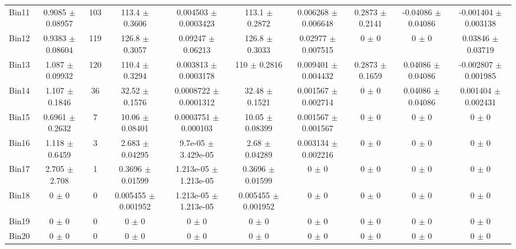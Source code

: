 \begin{tabular}{@{\extracolsep{4pt}}lccccccccc@{}}
     Bin11 & 0.9085 $\pm$ 0.08957 & 103 & 113.4 $\pm$ 0.3606 & 0.004503 $\pm$ 0.0003423 & 113.1 $\pm$ 0.2872 & 0.006268 $\pm$ 0.006648 & 0.2873 $\pm$ 0.2141 & -0.04086 $\pm$ 0.04086 & -0.001404 $\pm$ 0.003138 \\ 
     Bin12 & 0.9383 $\pm$ 0.08604 & 119 & 126.8 $\pm$ 0.3057 & 0.09247 $\pm$ 0.06213 & 126.8 $\pm$ 0.3033 & 0.02977 $\pm$ 0.007515 & 0 $\pm$ 0 & 0 $\pm$ 0 & 0.03846 $\pm$ 0.03719 \\ 
     Bin13 & 1.087 $\pm$ 0.09932 & 120 & 110.4 $\pm$ 0.3294 & 0.003813 $\pm$ 0.0003178 & 110 $\pm$ 0.2816 & 0.009401 $\pm$ 0.004432 & 0.2873 $\pm$ 0.1659 & 0.04086 $\pm$ 0.04086 & -0.002807 $\pm$ 0.001985 \\ 
     Bin14 & 1.107 $\pm$ 0.1846 & 36 & 32.52 $\pm$ 0.1576 & 0.0008722 $\pm$ 0.0001312 & 32.48 $\pm$ 0.1521 & 0.001567 $\pm$ 0.002714 & 0 $\pm$ 0 & 0.04086 $\pm$ 0.04086 & 0.001404 $\pm$ 0.002431 \\ 
     Bin15 & 0.6961 $\pm$ 0.2632 & 7 & 10.06 $\pm$ 0.08401 & 0.0003751 $\pm$ 0.000103 & 10.05 $\pm$ 0.08399 & 0.001567 $\pm$ 0.001567 & 0 $\pm$ 0 & 0 $\pm$ 0 & 0 $\pm$ 0 \\ 
     Bin16 & 1.118 $\pm$ 0.6459 & 3 & 2.683 $\pm$ 0.04295 & 9.7e-05 $\pm$ 3.429e-05 & 2.68 $\pm$ 0.04289 & 0.003134 $\pm$ 0.002216 & 0 $\pm$ 0 & 0 $\pm$ 0 & 0 $\pm$ 0 \\ 
     Bin17 & 2.705 $\pm$ 2.708 & 1 & 0.3696 $\pm$ 0.01599 & 1.213e-05 $\pm$ 1.213e-05 & 0.3696 $\pm$ 0.01599 & 0 $\pm$ 0 & 0 $\pm$ 0 & 0 $\pm$ 0 & 0 $\pm$ 0 \\ 
     Bin18 & 0 $\pm$ 0 & 0 & 0.005455 $\pm$ 0.001952 & 1.213e-05 $\pm$ 1.213e-05 & 0.005455 $\pm$ 0.001952 & 0 $\pm$ 0 & 0 $\pm$ 0 & 0 $\pm$ 0 & 0 $\pm$ 0 \\ 
     Bin19 & 0 $\pm$ 0 & 0 & 0 $\pm$ 0 & 0 $\pm$ 0 & 0 $\pm$ 0 & 0 $\pm$ 0 & 0 $\pm$ 0 & 0 $\pm$ 0 & 0 $\pm$ 0 \\ 
     Bin20 & 0 $\pm$ 0 & 0 & 0 $\pm$ 0 & 0 $\pm$ 0 & 0 $\pm$ 0 & 0 $\pm$ 0 & 0 $\pm$ 0 & 0 $\pm$ 0 & 0 $\pm$ 0 \\ 
\hline\hline
  \end{tabular}

